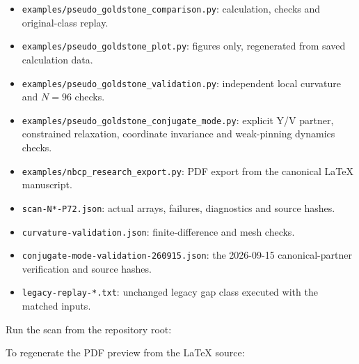 \begin{itemize}
\tightlist
\item
  {\small\texttt{\nolinkurl{examples/pseudo_goldstone_comparison.py}}}:
  calculation, checks and original-class replay.
\item
  {\small\texttt{\nolinkurl{examples/pseudo_goldstone_plot.py}}}:
  figures only, regenerated from saved calculation data.
\item
  {\small\texttt{\nolinkurl{examples/pseudo_goldstone_validation.py}}}:
  independent local curvature and \(N=96\) checks.
\item
  {\small\texttt{\nolinkurl{examples/pseudo_goldstone_conjugate_mode.py}}}:
  explicit Y/V partner, constrained relaxation, coordinate invariance
  and weak-pinning dynamics checks.
\item
  {\small\texttt{\nolinkurl{examples/nbcp_research_export.py}}}: PDF
  export from the canonical LaTeX manuscript.
\item
  {\small\texttt{\nolinkurl{scan-N*-P72.json}}}: actual arrays,
  failures, diagnostics and source hashes.
\item
  {\small\texttt{\nolinkurl{curvature-validation.json}}}:
  finite-difference and mesh checks.
\item
  {\small\texttt{\nolinkurl{conjugate-mode-validation-260915.json}}}:
  the 2026-09-15 canonical-partner verification and source hashes.
\item
  {\small\texttt{\nolinkurl{legacy-replay-*.txt}}}: unchanged legacy gap
  class executed with the matched inputs.
\end{itemize}

Run the scan from the repository root:

\begin{Shaded}
\begin{Highlighting}[]
\OperatorTok{=}\OperatorTok{=}\DataTypeTok{\textbackslash{}}
  \DataTypeTok{\textbackslash{}}
\end{Highlighting}
\end{Shaded}

To regenerate the PDF preview from the LaTeX source:

\begin{Shaded}
\begin{Highlighting}[]
\end{Highlighting}
\end{Shaded}

